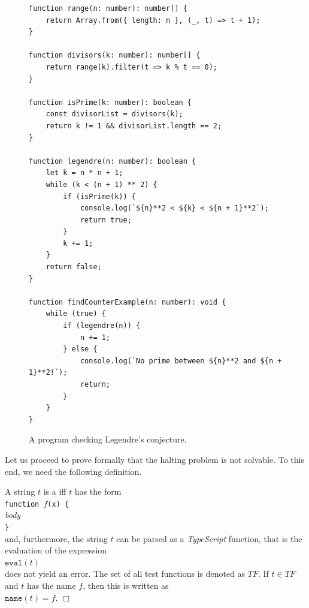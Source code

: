 \begin{figure}[!ht]
\centering
\begin{verbatim}
function range(n: number): number[] {
    return Array.from({ length: n }, (_, t) => t + 1);
}

function divisors(k: number): number[] {
    return range(k).filter(t => k % t == 0);
}

function isPrime(k: number): boolean {
    const divisorList = divisors(k);
    return k != 1 && divisorList.length == 2;
}

function legendre(n: number): boolean {
    let k = n * n + 1;
    while (k < (n + 1) ** 2) {
        if (isPrime(k)) {
            console.log(`${n}**2 < ${k} < ${n + 1}**2`);
            return true;
        }
        k += 1;
    }
    return false;
}

function findCounterExample(n: number): void {
    while (true) {
        if (legendre(n)) {
            n += 1;
        } else {
            console.log(`No prime between ${n}**2 and ${n + 1}**2!`);
            return;
        }
    }
}
\end{verbatim} 
\vspace*{-0.3cm}
\caption{A program checking Legendre's conjecture.}
\label{fig:legendre.stlx}
\end{figure}

Let us proceed to prove formally that the halting problem is not 
solvable.  To this end, we need the
following definition.


\begin{Definition} 
A string $t$ is a  
iff $t$ has the form \\[0.2cm]
\hspace*{1.3cm} \texttt{\textasciigrave}\texttt{function $f$(x) \{} \\
\hspace*{1.8cm} \textsl{body}        \\
\hspace*{1.45cm} \texttt{\}\textasciigrave}         \\[0.2cm]
and, furthermore, the string $t$ can be parsed as a \textsl{TypeScript} function, that is the evaluation of
the expression
\\[0.2cm]
\hspace*{1.3cm}
$\texttt{eval}(t)$
\\[0.2cm]
does not yield an error.
The set of all test functions is denoted as $T\!F$.
If $t \in T\!F$ and $t$ has the name $f$, then
this is written as 
\\[0.2cm]
\hspace*{1.3cm}
$\mathtt{name}(t) = f$.
\hspace*{\fill} $\Box$
\end{Definition}

